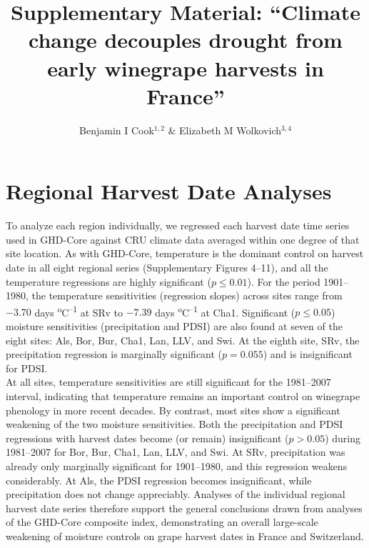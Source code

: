 \documentclass[12pt]{article}
\title{Supplementary Material: 
``Climate change decouples drought from early winegrape harvests in France''}
\author{Benjamin I Cook$^{1,2}$ \& Elizabeth M Wolkovich$^{3,4}$}
\begin{document}
\maketitle

\section*{Regional Harvest Date Analyses} 
\noindent To analyze each region individually, we regressed each harvest date time series used in GHD-Core against CRU climate data averaged within one degree of that site location. As with GHD-Core, temperature is the dominant control on harvest date in all eight regional series (Supplementary Figures 4--11), and all the temperature regressions are highly significant ($p\le0.01$). For the period 1901--1980, the temperature sensitivities (regression slopes) across sites range from $-3.70$ days \textsuperscript{o}C\textsuperscript{--1} at SRv to $-7.39$ days \textsuperscript{o}C\textsuperscript{--1} at Cha1. Significant ($p\le0.05$) moisture sensitivities (precipitation and PDSI) are also found at seven of the eight sites: Als, Bor, Bur, Cha1, Lan, LLV, and Swi. At the eighth site, SRv, the precipitation regression is marginally significant ($p=0.055$) and is insignificant for PDSI.\\
\indent At all sites, temperature sensitivities are still significant for the 1981--2007 interval, indicating that temperature remains an important control on winegrape phenology in more recent decades. By contrast, most sites show a significant weakening of the two moisture sensitivities. Both the precipitation and PDSI regressions with harvest dates become (or remain) insignificant ($p>0.05$) during 1981--2007 for Bor, Bur, Cha1, Lan, LLV, and Swi. At SRv, precipitation was already only marginally significant for 1901--1980, and this regression weakens considerably. At Als, the PDSI regression becomes insignificant, while precipitation does not change appreciably. Analyses of the individual regional harvest date series therefore support the general conclusions drawn from analyses of the GHD-Core composite index, demonstrating an overall large-scale weakening of moisture controls on grape harvest dates in France and Switzerland.
\end{document}
